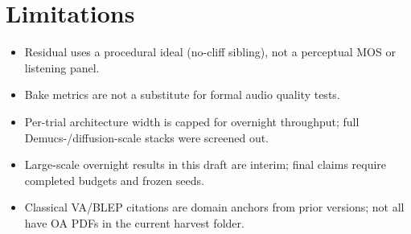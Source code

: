 \section{Limitations}
\label{sec:limitations}

\begin{itemize}
  \item Residual uses a procedural ideal (no-cliff sibling), not a perceptual MOS or listening panel.
  \item Bake metrics are not a substitute for formal audio quality tests.
  \item Per-trial architecture width is capped for overnight throughput; full Demucs-/diffusion-scale stacks were screened out.
  \item Large-scale overnight results in this draft are interim; final claims require completed budgets and frozen seeds.
  \item Classical VA/BLEP citations are domain anchors from prior versions; not all have OA PDFs in the current harvest folder.
\end{itemize}
